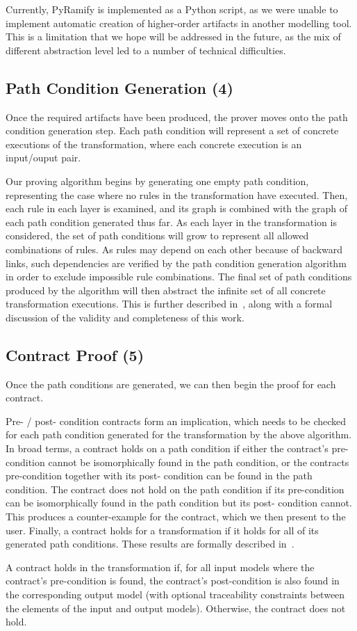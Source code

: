 Currently, PyRamify is implemented as a Python script, as we were unable to implement automatic creation of higher-order artifacts in another modelling tool. This is a limitation that we hope will be addressed in the future, as the mix of different abstraction level led to a number of technical difficulties.

\subsection{Path Condition Generation (4)}

Once the required artifacts have been produced, the prover moves onto the path condition generation step.  Each
path condition will represent a set of concrete executions
of the transformation, where each concrete execution is an
input/ouput pair.

Our proving algorithm begins by generating one empty
path condition, representing the case where no rules in the
transformation have executed. Then, each rule in each layer
is examined, and its graph is combined with the graph of
each path condition generated thus far. As each layer in the
transformation is considered, the set of path conditions will
grow to represent all allowed combinations of rules. As rules
may depend on each other because of backward links, such
dependencies are verified by the path condition generation
algorithm in order to exclude impossible rule combinations.
The final set of path conditions produced by the algorithm
will then abstract the infinite set of all concrete transformation
executions. This is further described in~\cite{Lucio2014}, along with a
formal discussion of the validity and completeness of this
work.

\subsection{Contract Proof (5)}

Once the path conditions are generated, we can then begin the proof for each contract.

Pre- / post- condition contracts form an implication, which
needs to be checked for each path condition generated for
the transformation by the above algorithm. In broad terms,
a contract holds on a path condition if either the contract’s
pre-condition cannot be isomorphically found in the path
condition, or the contracts pre-condition together with its post-
condition can be found in the path condition. The contract
does not hold on the path condition if its pre-condition can
be isomorphically found in the path condition but its post-
condition cannot. This produces a counter-example for the contract, which we then present to the user. Finally, a contract holds for a transformation if it holds for all of its generated path conditions. These results
are formally described in~\cite{Lucio2014}.

A contract holds in the transformation if, for all input models where the contract's pre-condition is found, the contract's post-condition is also found in the corresponding output model (with optional traceability constraints between the elements of the input and output models). Otherwise, the contract does not hold.



